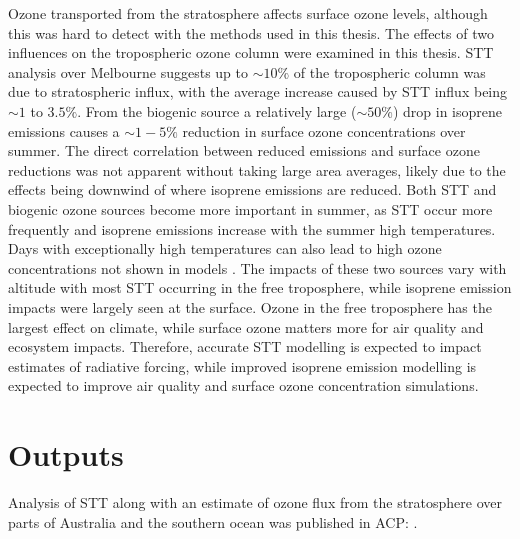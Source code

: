   
  Ozone transported from the stratosphere affects surface ozone levels, although this was hard to detect with the methods used in this thesis.
  The effects of two influences on the tropospheric ozone column were examined in this thesis.
  STT analysis over Melbourne suggests up to $\sim 10\%$ of the tropospheric column was due to stratospheric influx, with the average increase caused by STT influx being $\sim 1$ to $3.5\%$.
  From the biogenic source a relatively large ($\sim{50}\%$) drop in isoprene emissions causes a $\sim{1-5}\%$ reduction in surface ozone concentrations over summer.
  The direct correlation between reduced emissions and surface ozone reductions was not apparent without taking large area averages, likely due to the effects being downwind of where isoprene emissions are reduced.
  Both STT and biogenic ozone sources become more important in summer, as STT occur more frequently and isoprene emissions increase with the summer high temperatures.
  Days with exceptionally high temperatures can also lead to high ozone concentrations not shown in models \parencite[e.g.,][]{PatonWalsh2018}.
  The impacts of these two sources vary with altitude with most STT occurring in the free troposphere, while isoprene emission impacts were largely seen at the surface.
  Ozone in the free troposphere has the largest effect on climate, while surface ozone matters more for air quality and ecosystem impacts.
  Therefore, accurate STT modelling is expected to impact estimates of radiative forcing, while improved isoprene emission modelling is expected to improve air quality and surface ozone concentration simulations.
  

  
  
\section{Outputs}
  \label{Conclusions:outputs}
  
  Analysis of STT along with an estimate of ozone flux from the stratosphere over parts of Australia and the southern ocean was published in ACP: .
  
